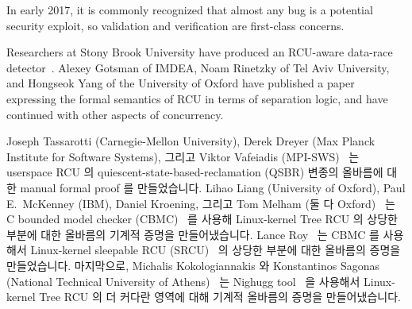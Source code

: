 In early 2017, it is commonly recognized that almost any bug is a potential
security exploit, so validation and verification are first-class concerns.

Researchers at Stony Brook University have produced an RCU-aware data-race
detector~\cite{AbhinavDuggal2010Masters,JustinSeyster2012PhD,Seyster:2011:RFA:2075416.2075425}.
Alexey Gotsman of IMDEA, Noam Rinetzky of Tel Aviv University,
and Hongseok Yang of the University of Oxford have published a
paper~\cite{AlexeyGotsman2012VerifyGraceExtended} expressing the formal
semantics of RCU in terms of separation logic, and have continued with
other aspects of concurrency.
\fi

Joseph Tassarotti (Carnegie-Mellon University), Derek Dreyer (Max
Planck Institute for Software Systems), 그리고 Viktor Vafeiadis
(MPI-SWS)~\cite{JosephTassarotti2015RCUproof} 는 userspace RCU 의
quiescent-state-based-reclamation (QSBR) 변종의 올바름에 대한 manual formal
proof 를 만들었습니다.
Lihao Liang (University of Oxford), Paul E.~McKenney (IBM),
Daniel Kroening, 그리고 Tom Melham
(둘 다 Oxford)~\cite{LihaoLiang2016VerifyTreeRCU} 는 C bounded model checker
(CBMC)~\cite{EdmundClarke2004CBMC} 를 사용해 Linux-kernel Tree RCU 의 상당한
부분에 대한 올바름의 기계적 증명을 만들어냈습니다.
Lance Roy~\cite{LanceRoy2017CBMC-SRCU} 는 CBMC 를 사용해서 Linux-kernel
sleepable RCU (SRCU)~\cite{PaulEMcKenney2006c} 의 상당한 부분에 대한 올바름의
증명을 만들었습니다.
마지막으로, Michalis Kokologiannakis 와 Konstantinos Sagonas (National
Technical University of Athens)~\cite{MichalisKokologiannakis2017NidhuggRCU}
는 Nighugg tool~\cite{CarlLeonardsson2014Nidhugg} 을 사용해서 Linux-kernel Tree
RCU 의 더 커다란 영역에 대해 기계적 올바름의 증명을 만들어냈습니다.
\iffalse

Joseph Tassarotti (Carnegie-Mellon University), Derek Dreyer (Max
Planck Institute for Software Systems), and Viktor Vafeiadis
(also MPI-SWS)~\cite{JosephTassarotti2015RCUproof}
produced a manual formal proof of correctness of the quiescent-state-based
reclamation (QSBR) variant of userspace
RCU~\cite{MathieuDesnoyers2009URCU,MathieuDesnoyers2012URCU}.
Lihao Liang (University of Oxford), Paul E.~McKenney (IBM),
Daniel Kroening, and Tom Melham
(both also Oxford)~\cite{LihaoLiang2016VerifyTreeRCU}
used the C bounded model checker (CBMC)~\cite{EdmundClarke2004CBMC}
to produce a mechanical proof of correctness of a significant portion
of Linux-kernel Tree RCU.
Lance Roy~\cite{LanceRoy2017CBMC-SRCU} used CBMC to produce a similar
proof of correctness for a significant portion of Linux-kernel
sleepable RCU (SRCU)~\cite{PaulEMcKenney2006c}.
Finally, Michalis Kokologiannakis and Konstantinos Sagonas (National Technical University of
Athens)~\cite{MichalisKokologiannakis2017NidhuggRCU}
used the Nighugg tool~\cite{CarlLeonardsson2014Nidhugg}
to produce a mechanical proof of correctness of a somewhat larger
portion of Linux-kernel Tree RCU.
\fi

